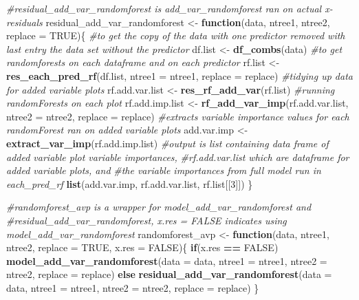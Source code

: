 \documentclass[12pt,twoside]{reedthesis}
\newenvironment{Shaded}{\begin{snugshade}}{\end{snugshade}}
\newcommand{\KeywordTok}[1]{\textcolor[rgb]{0.13,0.29,0.53}{\textbf{#1}}}
\newcommand{\DataTypeTok}[1]{\textcolor[rgb]{0.13,0.29,0.53}{#1}}
\newcommand{\DecValTok}[1]{\textcolor[rgb]{0.00,0.00,0.81}{#1}}
\newcommand{\StringTok}[1]{\textcolor[rgb]{0.31,0.60,0.02}{#1}}
\newcommand{\CommentTok}[1]{\textcolor[rgb]{0.56,0.35,0.01}{\textit{#1}}}
\newcommand{\OtherTok}[1]{\textcolor[rgb]{0.56,0.35,0.01}{#1}}
\newcommand{\ControlFlowTok}[1]{\textcolor[rgb]{0.13,0.29,0.53}{\textbf{#1}}}
\newcommand{\OperatorTok}[1]{\textcolor[rgb]{0.81,0.36,0.00}{\textbf{#1}}}
\newcommand{\NormalTok}[1]{#1}
\theoremstyle{definition}
\theoremstyle{definition}
\theoremstyle{definition}
\theoremstyle{remark}
\begin{document}
\begin{Shaded}
\begin{Highlighting}[]
{\CommentTok{#residual_add_var_randomforest is add_var_randomforest ran on actual x-residuals}
\NormalTok{residual_add_var_randomforest <-}\StringTok{ }\ControlFlowTok{function}\NormalTok{(data, ntree1, ntree2, }\DataTypeTok{replace =} \OtherTok{TRUE}\NormalTok{)\{}
  \CommentTok{#to get the copy of the data with one predictor removed with last entry the data set without the predictor}
\NormalTok{  df.list <-}\StringTok{ }\KeywordTok{df_combs}\NormalTok{(data)}
  \CommentTok{#to get randomforests on each dataframe and on each predictor}
\NormalTok{  rf.list <-}\StringTok{ }\KeywordTok{res_each_pred_rf}\NormalTok{(df.list, }\DataTypeTok{ntree1 =}\NormalTok{ ntree1, }\DataTypeTok{replace =}\NormalTok{ replace)}
  \CommentTok{#tidying up data for added variable plots}
\NormalTok{  rf.add.var.list <-}\StringTok{ }\KeywordTok{res_rf_add_var}\NormalTok{(rf.list)}
  \CommentTok{#running randomForests on each plot}
\NormalTok{  rf.add.imp.list <-}\StringTok{ }\KeywordTok{rf_add_var_imp}\NormalTok{(rf.add.var.list, }\DataTypeTok{ntree2 =}\NormalTok{ ntree2, }\DataTypeTok{replace =}\NormalTok{ replace)}
  \CommentTok{#extracts variable importance values for each randomForest ran on added variable plots}
\NormalTok{  add.var.imp <-}\StringTok{ }\KeywordTok{extract_var_imp}\NormalTok{(rf.add.imp.list)}
  \CommentTok{#output is list containing data frame of added variable plot variable importances, }
  \CommentTok{#rf.add.var.list which are dataframe for added variable plots, and }
  \CommentTok{#the variable importances from full model run in each_pred_rf}
  \KeywordTok{list}\NormalTok{(add.var.imp, rf.add.var.list, rf.list[[}\DecValTok{3}\NormalTok{]])}
\NormalTok{\}}

\CommentTok{#randomforest_avp is a wrapper for model_add_var_randomforest and }
\CommentTok{#residual_add_var_randomforest, x.res = FALSE indicates using model_add_var_randomforest}
\NormalTok{randomforest_avp <-}\StringTok{ }\ControlFlowTok{function}\NormalTok{(data, ntree1, ntree2, }\DataTypeTok{replace =} \OtherTok{TRUE}\NormalTok{, }\DataTypeTok{x.res =} \OtherTok{FALSE}\NormalTok{)\{}
  \ControlFlowTok{if}\NormalTok{(x.res }\OperatorTok{==}\StringTok{ }\OtherTok{FALSE}\NormalTok{) }\KeywordTok{model_add_var_randomforest}\NormalTok{(}\DataTypeTok{data =}\NormalTok{ data, }\DataTypeTok{ntree1 =}\NormalTok{ ntree1, }
                                                    \DataTypeTok{ntree2 =}\NormalTok{ ntree2, }\DataTypeTok{replace =}\NormalTok{ replace)}
  \ControlFlowTok{else} \KeywordTok{residual_add_var_randomforest}\NormalTok{(}\DataTypeTok{data =}\NormalTok{ data, }\DataTypeTok{ntree1 =}\NormalTok{ ntree1, }\DataTypeTok{ntree2 =}\NormalTok{ ntree2, }\DataTypeTok{replace =}\NormalTok{ replace)}
\NormalTok{\}}

}
\end{Highlighting}
\end{Shaded}
\end{document}
